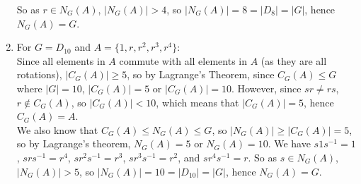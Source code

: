 \documentclass[12pt]{article}
\begin{document}
\begin{enumerate}[label=\textbf{\alph*.}]
            So as $r \in N_G(A)$, $|N_G(A)| > 4$,
            so $|N_G(A)| = 8 = |D_8| = |G|$,
            hence $N_G(A) = G$.
        \item
            For $G = D_{10}$ and $A = \{ 1, r, r^2, r^3, r^4 \}$: \\
            Since all elements in $A$ commute with all elements in $A$
            (as they are all rotations),
            $|C_G(A)| \geqslant 5$,
            so by Lagrange's Theorem,
            since $C_G(A) \leqslant G$ where $|G| = 10$,
            $|C_G(A)| = 5$ or $|C_G(A)| = 10$.
            However, since $sr \neq rs$, $r \notin C_G(A)$,
            so $|C_G(A)| < 10$,
            which means that $|C_G(A)| = 5$,
            hence $C_G(A) = A$. \\
            We also know that $C_G(A) \leqslant N_G(A) \leqslant G$,
            so $|N_G(A)| \geqslant |C_G(A)| = 5$,
            so by Lagrange's theorem, $N_G(A) = 5$ or $N_G(A) = 10$.
            We have $s1s^{-1} = 1$, $srs^{-1} = r^4$,
            $sr^2s^{-1} = r^3$, $sr^3s^{-1} = r^2$, and $sr^4s^{-1} = r$.
            So as $s \in N_G(A)$, $|N_G(A)| > 5$,
            so $|N_G(A)| = 10 = |D_{10}| = |G|$,
            hence $N_G(A) = G$.
    \end{enumerate}
\end{document}
